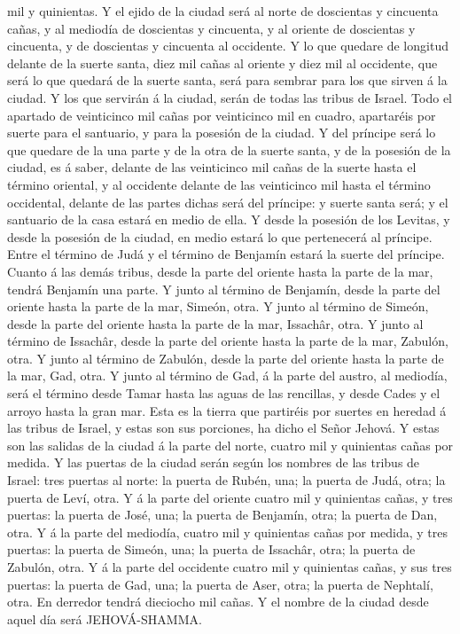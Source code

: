 mil y quinientas.  Y el ejido de la ciudad será al norte de
doscientas y cincuenta cañas, y al mediodía de doscientas y cincuenta, y
al oriente de doscientas y cincuenta, y de doscientas y cincuenta al
occidente.  Y lo que quedare de longitud delante de la
suerte santa, diez mil cañas al oriente y diez mil al occidente, que
será lo que quedará de la suerte santa, será para sembrar para los que
sirven á la ciudad.  Y los que servirán á la ciudad, serán
de todas las tribus de Israel.  Todo el apartado de
veinticinco mil cañas por veinticinco mil en cuadro, apartaréis por
suerte para el santuario, y para la posesión de la ciudad. 
Y del príncipe será lo que quedare de la una parte y de la otra de la
suerte santa, y de la posesión de la ciudad, es á saber, delante de las
veinticinco mil cañas de la suerte hasta el término oriental, y al
occidente delante de las veinticinco mil hasta el término occidental,
delante de las partes dichas será del príncipe: y suerte santa será; y
el santuario de la casa estará en medio de ella.  Y desde
la posesión de los Levitas, y desde la posesión de la ciudad, en medio
estará lo que pertenecerá al príncipe. Entre el término de Judá y el
término de Benjamín estará la suerte del príncipe.  Cuanto
á las demás tribus, desde la parte del oriente hasta la parte de la mar,
tendrá Benjamín una parte.  Y junto al término de Benjamín,
desde la parte del oriente hasta la parte de la mar, Simeón, otra.
 Y junto al término de Simeón, desde la parte del oriente
hasta la parte de la mar, Issachâr, otra.  Y junto al
término de Issachâr, desde la parte del oriente hasta la parte de la
mar, Zabulón, otra.  Y junto al término de Zabulón, desde
la parte del oriente hasta la parte de la mar, Gad, otra. 
Y junto al término de Gad, á la parte del austro, al mediodía, será el
término desde Tamar hasta las aguas de las rencillas, y desde Cades y el
arroyo hasta la gran mar.  Esta es la tierra que partiréis
por suertes en heredad á las tribus de Israel, y estas son sus
porciones, ha dicho el Señor Jehová.  Y estas son las
salidas de la ciudad á la parte del norte, cuatro mil y quinientas cañas
por medida.  Y las puertas de la ciudad serán según los
nombres de las tribus de Israel: tres puertas al norte: la puerta de
Rubén, una; la puerta de Judá, otra; la puerta de Leví, otra.
 Y á la parte del oriente cuatro mil y quinientas cañas, y
tres puertas: la puerta de José, una; la puerta de Benjamín, otra; la
puerta de Dan, otra.  Y á la parte del mediodía, cuatro mil
y quinientas cañas por medida, y tres puertas: la puerta de Simeón, una;
la puerta de Issachâr, otra; la puerta de Zabulón, otra.  Y
á la parte del occidente cuatro mil y quinientas cañas, y sus tres
puertas: la puerta de Gad, una; la puerta de Aser, otra; la puerta de
Nephtalí, otra.  En derredor tendrá dieciocho mil cañas. Y
el nombre de la ciudad desde aquel día será JEHOVÁ-SHAMMA.
